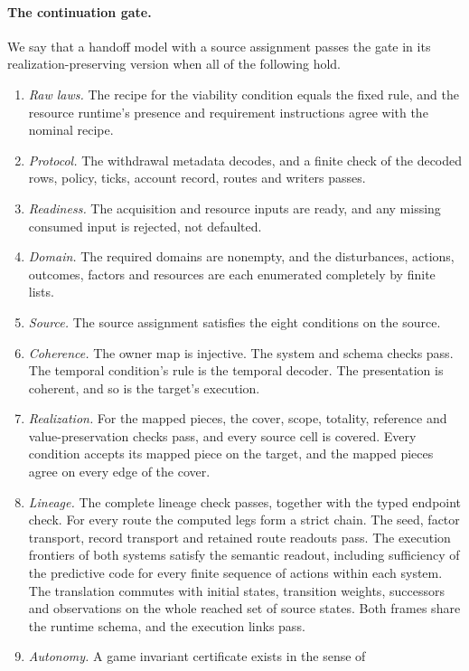 \paragraph{The continuation gate.}
We say that a handoff model with a source assignment passes the gate in its
realization-preserving version when all of the following hold.
\begin{enumerate}
\item \emph{Raw laws.} The recipe for the viability condition equals the fixed
rule, and the resource runtime's presence and requirement instructions agree
with the nominal recipe.
\item \emph{Protocol.} The withdrawal metadata decodes, and a finite check of
the decoded rows, policy, ticks, account record, routes and writers passes.
\item \emph{Readiness.} The acquisition and resource inputs are ready, and
any missing consumed input is rejected, not defaulted.
\item \emph{Domain.} The required domains are nonempty, and the disturbances,
actions, outcomes, factors and resources are each enumerated completely by
finite lists.
\item \emph{Source.} The source assignment satisfies the eight conditions on
the source.
\item \emph{Coherence.} The owner map is injective. The system and schema
checks pass. The temporal condition's rule is the temporal decoder. The
presentation is coherent, and so is the target's execution.
\item \emph{Realization.} For the mapped pieces, the cover, scope, totality,
reference and value-preservation checks pass, and every source cell is
covered. Every condition accepts its mapped piece on the target, and the
mapped pieces agree on every edge of the cover.
\item \emph{Lineage.} The complete lineage check passes, together with the
typed endpoint check. For every route the computed legs form a strict chain.
The seed, factor transport, record transport and retained route readouts pass.
The execution frontiers of both systems satisfy the semantic readout,
including sufficiency of the predictive code for every finite sequence of
actions within each system. The translation commutes with initial states,
transition weights, successors and observations on the whole reached set of
source states. Both frames share the runtime schema, and the execution links
pass.
\item \emph{Autonomy.} A game invariant certificate exists in the sense of

\end{enumerate}
